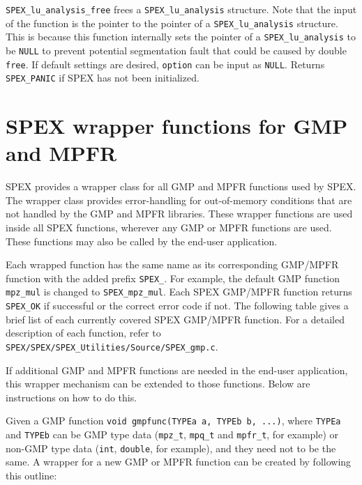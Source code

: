 \documentclass[12pt]{report}
\theoremstyle{definition}
\begin{document}
\verb|SPEX_lu_analysis_free| frees a \verb|SPEX_lu_analysis| structure.
Note that the input of the function is the pointer to the pointer of a
\verb|SPEX_lu_analysis| structure. This is because this function internally
sets the pointer of a \verb|SPEX_lu_analysis| to be \verb|NULL| to prevent
potential segmentation fault that could be caused by double \verb|free|.
If default settings are desired, \verb|option| can be input as \verb|NULL|.
Returns \verb|SPEX_PANIC| if SPEX has not been initialized.

\section{SPEX wrapper functions for GMP and MPFR}

SPEX provides a wrapper class for all GMP and MPFR functions used by SPEX.
The wrapper class provides error-handling for out-of-memory conditions
that are not handled by the GMP and MPFR libraries.  These wrapper functions
are used inside all SPEX functions, wherever any GMP or MPFR functions are
used.  These functions may also be called by the end-user application.

Each wrapped function has the same name as its corresponding GMP/MPFR function
with the added prefix \verb|SPEX_|. For example, the default GMP function
\verb|mpz_mul| is changed to \verb|SPEX_mpz_mul|. Each SPEX GMP/MPFR function
returns \verb|SPEX_OK| if successful or the correct error code if not. The
following table gives a brief list of each currently covered SPEX GMP/MPFR
function. For a detailed description of each function, refer to
\verb|SPEX/SPEX/SPEX_Utilities/Source/SPEX_gmp.c|.

If additional GMP and MPFR functions are needed in the end-user application,
this wrapper mechanism can be extended to those functions.  Below are
instructions on how to do this.

Given a GMP function \verb|void gmpfunc(TYPEa a, TYPEb b, ...)|, where
\verb|TYPEa| and \verb|TYPEb| can be GMP type data (\verb|mpz_t|,
\verb|mpq_t| and \verb|mpfr_t|, for example) or non-GMP type data (\verb|int|,
\verb|double|, for example), and they need not to be the same.
A wrapper for a new GMP or MPFR function can be created by following
this outline:
\end{document}
